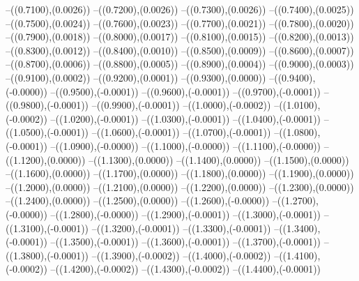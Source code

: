 {	--({\sx*(0.7100)},{\sy*(0.0026)})
	--({\sx*(0.7200)},{\sy*(0.0026)})
	--({\sx*(0.7300)},{\sy*(0.0026)})
	--({\sx*(0.7400)},{\sy*(0.0025)})
	--({\sx*(0.7500)},{\sy*(0.0024)})
	--({\sx*(0.7600)},{\sy*(0.0023)})
	--({\sx*(0.7700)},{\sy*(0.0021)})
	--({\sx*(0.7800)},{\sy*(0.0020)})
	--({\sx*(0.7900)},{\sy*(0.0018)})
	--({\sx*(0.8000)},{\sy*(0.0017)})
	--({\sx*(0.8100)},{\sy*(0.0015)})
	--({\sx*(0.8200)},{\sy*(0.0013)})
	--({\sx*(0.8300)},{\sy*(0.0012)})
	--({\sx*(0.8400)},{\sy*(0.0010)})
	--({\sx*(0.8500)},{\sy*(0.0009)})
	--({\sx*(0.8600)},{\sy*(0.0007)})
	--({\sx*(0.8700)},{\sy*(0.0006)})
	--({\sx*(0.8800)},{\sy*(0.0005)})
	--({\sx*(0.8900)},{\sy*(0.0004)})
	--({\sx*(0.9000)},{\sy*(0.0003)})
	--({\sx*(0.9100)},{\sy*(0.0002)})
	--({\sx*(0.9200)},{\sy*(0.0001)})
	--({\sx*(0.9300)},{\sy*(0.0000)})
	--({\sx*(0.9400)},{\sy*(-0.0000)})
	--({\sx*(0.9500)},{\sy*(-0.0001)})
	--({\sx*(0.9600)},{\sy*(-0.0001)})
	--({\sx*(0.9700)},{\sy*(-0.0001)})
	--({\sx*(0.9800)},{\sy*(-0.0001)})
	--({\sx*(0.9900)},{\sy*(-0.0001)})
	--({\sx*(1.0000)},{\sy*(-0.0002)})
	--({\sx*(1.0100)},{\sy*(-0.0002)})
	--({\sx*(1.0200)},{\sy*(-0.0001)})
	--({\sx*(1.0300)},{\sy*(-0.0001)})
	--({\sx*(1.0400)},{\sy*(-0.0001)})
	--({\sx*(1.0500)},{\sy*(-0.0001)})
	--({\sx*(1.0600)},{\sy*(-0.0001)})
	--({\sx*(1.0700)},{\sy*(-0.0001)})
	--({\sx*(1.0800)},{\sy*(-0.0001)})
	--({\sx*(1.0900)},{\sy*(-0.0000)})
	--({\sx*(1.1000)},{\sy*(-0.0000)})
	--({\sx*(1.1100)},{\sy*(-0.0000)})
	--({\sx*(1.1200)},{\sy*(0.0000)})
	--({\sx*(1.1300)},{\sy*(0.0000)})
	--({\sx*(1.1400)},{\sy*(0.0000)})
	--({\sx*(1.1500)},{\sy*(0.0000)})
	--({\sx*(1.1600)},{\sy*(0.0000)})
	--({\sx*(1.1700)},{\sy*(0.0000)})
	--({\sx*(1.1800)},{\sy*(0.0000)})
	--({\sx*(1.1900)},{\sy*(0.0000)})
	--({\sx*(1.2000)},{\sy*(0.0000)})
	--({\sx*(1.2100)},{\sy*(0.0000)})
	--({\sx*(1.2200)},{\sy*(0.0000)})
	--({\sx*(1.2300)},{\sy*(0.0000)})
	--({\sx*(1.2400)},{\sy*(0.0000)})
	--({\sx*(1.2500)},{\sy*(0.0000)})
	--({\sx*(1.2600)},{\sy*(-0.0000)})
	--({\sx*(1.2700)},{\sy*(-0.0000)})
	--({\sx*(1.2800)},{\sy*(-0.0000)})
	--({\sx*(1.2900)},{\sy*(-0.0001)})
	--({\sx*(1.3000)},{\sy*(-0.0001)})
	--({\sx*(1.3100)},{\sy*(-0.0001)})
	--({\sx*(1.3200)},{\sy*(-0.0001)})
	--({\sx*(1.3300)},{\sy*(-0.0001)})
	--({\sx*(1.3400)},{\sy*(-0.0001)})
	--({\sx*(1.3500)},{\sy*(-0.0001)})
	--({\sx*(1.3600)},{\sy*(-0.0001)})
	--({\sx*(1.3700)},{\sy*(-0.0001)})
	--({\sx*(1.3800)},{\sy*(-0.0001)})
	--({\sx*(1.3900)},{\sy*(-0.0002)})
	--({\sx*(1.4000)},{\sy*(-0.0002)})
	--({\sx*(1.4100)},{\sy*(-0.0002)})
	--({\sx*(1.4200)},{\sy*(-0.0002)})
	--({\sx*(1.4300)},{\sy*(-0.0002)})
	--({\sx*(1.4400)},{\sy*(-0.0001)})
}
